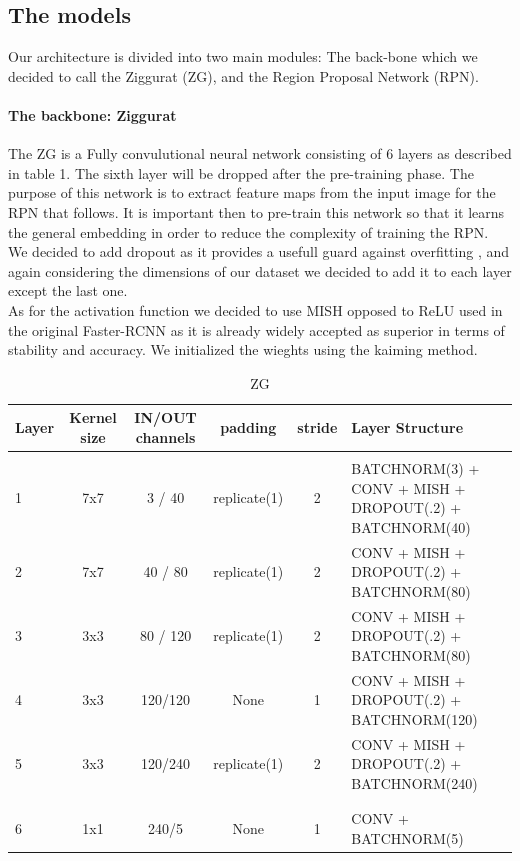 \documentclass[10pt,journal,cspaper,compsoc]{IEEEtran}
\begin{document}
    
    \subsection{The models}
    Our architecture is divided into two main modules: The back-bone which we decided to call the Ziggurat (ZG), and the Region Proposal Network (RPN).\\
    \paragraph{The backbone: Ziggurat}
    The ZG  is a Fully convulutional neural network consisting of 6 layers as described in table 1. The sixth layer will be dropped after the pre-training phase. The purpose of this network is to extract feature maps from the input image for the RPN that follows. It is important then to pre-train this network so that it learns the general embedding in order 
    to reduce the complexity of training the RPN. We decided to add dropout as it provides a usefull guard against overfitting \cite{Srivastava:Dropout}, and again considering the dimensions of our dataset we decided to add it to each layer except the last one.\\ As for the activation function we decided to use MISH opposed to ReLU used in the original Faster-RCNN as it is already 
    widely accepted as superior in terms of stability and accuracy. We initialized the wieghts using the kaiming method. \cite{arxiv:Kaiming} \\ 
    \begin{table}[htb]
        \centering
		\caption{ZG}
		\label{tab:Table 1}
		\begin{tabularx}{.9\paperwidth}{l | c | c | c | c |  l}  
			\textbf{Layer} & \textbf{Kernel size} & \textbf{IN/OUT channels} & \textbf{padding} & \textbf{stride} & \textbf{Layer Structure}\\
			\hline 
			& & & & & \\
			1 & 7x7 & 3 / 40 & replicate(1) & 2 & BATCHNORM(3) + CONV + MISH + DROPOUT(.2) + BATCHNORM(40) \\
			2 & 7x7 & 40 / 80 & replicate(1) & 2 & CONV + MISH + DROPOUT(.2) + BATCHNORM(80) \\
			3 & 3x3 & 80 / 120 & replicate(1) & 2 & CONV + MISH + DROPOUT(.2) + BATCHNORM(80) \\ 
			4 & 3x3 & 120/120 & None & 1 & CONV + MISH + DROPOUT(.2) + BATCHNORM(120)  \\
			5 & 3x3 & 120/240 & replicate(1) & 2 & CONV + MISH + DROPOUT(.2) + BATCHNORM(240) \\
			& & & & & \\
			\hline
			& & & & & \\
			6 & 1x1 & 240/5 & None & 1 & CONV + BATCHNORM(5)
		\end{tabularx}
    \end{table}
    
\end{document}
